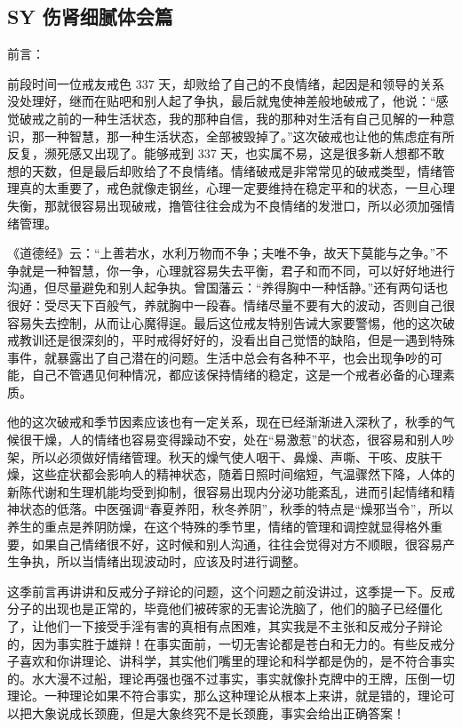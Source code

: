 \subsection{SY 伤肾细腻体会篇}

前言：

前段时间一位戒友戒色 337 天，却败给了自己的不良情绪，起因是和领导的关系没处理好，继而在贴吧和别人起了争执，最后就鬼使神差般地破戒了，他说：“感觉破戒之前的一种生活状态，我的那种自信，我的那种对生活有自己见解的一种意识，那一种智慧，那一种生活状态，全部被毁掉了。”这次破戒也让他的焦虑症有所反复，濒死感又出现了。能够戒到 337 天，也实属不易，这是很多新人想都不敢想的天数，但是最后却败给了不良情绪。情绪破戒是非常常见的破戒类型，情绪管理真的太重要了，戒色就像走钢丝，心理一定要维持在稳定平和的状态，一旦心理失衡，那就很容易出现破戒，撸管往往会成为不良情绪的发泄口，所以必须加强情绪管理。

《道德经》云：“上善若水，水利万物而不争；夫唯不争，故天下莫能与之争。”不争就是一种智慧，你一争，心理就容易失去平衡，君子和而不同，可以好好地进行沟通，但尽量避免和别人起争执。曾国藩云：“养得胸中一种恬静。”还有两句话也很好：受尽天下百般气，养就胸中一段春。情绪尽量不要有大的波动，否则自己很容易失去控制，从而让心魔得逞。最后这位戒友特别告诫大家要警惕，他的这次破戒教训还是很深刻的，平时戒得好好的，没看出自己觉悟的缺陷，但是一遇到特殊事件，就暴露出了自己潜在的问题。生活中总会有各种不平，也会出现争吵的可能，自己不管遇见何种情况，都应该保持情绪的稳定，这是一个戒者必备的心理素质。

他的这次破戒和季节因素应该也有一定关系，现在已经渐渐进入深秋了，秋季的气候很干燥，人的情绪也容易变得躁动不安，处在“易激惹”的状态，很容易和别人吵架，所以必须做好情绪管理。秋天的燥气使人咽干、鼻燥、声嘶、干咳、皮肤干燥，这些症状都会影响人的精神状态，随着日照时间缩短，气温骤然下降，人体的新陈代谢和生理机能均受到抑制，很容易出现内分泌功能紊乱，进而引起情绪和精神状态的低落。中医强调“春夏养阳，秋冬养阴”，秋季的特点是“燥邪当令”，所以养生的重点是养阴防燥，在这个特殊的季节里，情绪的管理和调控就显得格外重要，如果自己情绪很不好，这时候和别人沟通，往往会觉得对方不顺眼，很容易产生争执，所以当情绪出现波动时，应该及时进行调整。

这季前言再讲讲和反戒分子辩论的问题，这个问题之前没讲过，这季提一下。反戒分子的出现也是正常的，毕竟他们被砖家的无害论洗脑了，他们的脑子已经僵化了，让他们一下接受手淫有害的真相有点困难，其实我是不主张和反戒分子辩论的，因为事实胜于雄辩！在事实面前，一切无害论都是苍白和无力的。有些反戒分子喜欢和你讲理论、讲科学，其实他们嘴里的理论和科学都是伪的，是不符合事实的。水大漫不过船，理论再强也强不过事实，事实就像扑克牌中的王牌，压倒一切理论。一种理论如果不符合事实，那么这种理论从根本上来讲，就是错的，理论可以把大象说成长颈鹿，但是大象终究不是长颈鹿，事实会给出正确答案！

